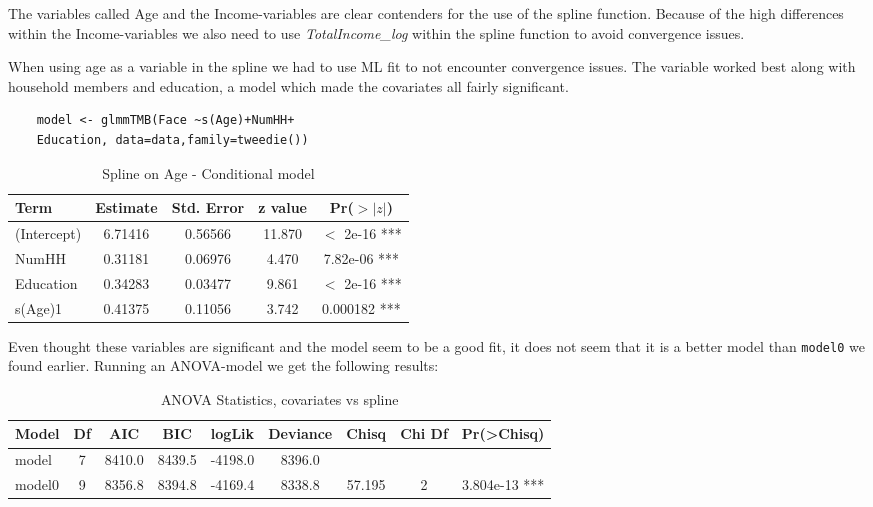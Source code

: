 \documentclass[12pt, twoside,hidelinks]{article}
\theoremstyle{definition}
\numberwithin{equation}{section}
\begin{document}
The variables called Age and the Income-variables are clear contenders for the use of the spline function. Because of the high differences within the Income-variables we also need to use \textit{TotalIncome\_log} within the spline function to avoid convergence issues.


\newline
When using age as a variable in the spline we had to use ML fit to not encounter convergence issues. The variable worked best along with household members and education, a model which made the covariates all fairly significant.


\begin{verbatim}
    model <- glmmTMB(Face ~s(Age)+NumHH+
    Education, data=data,family=tweedie())
\end{verbatim}

\begin{table}[h]
\centering
\begin{tabular}{lcccc}
\hline
Term        & Estimate & Std. Error & z value & Pr($>|z|$)      \\ 
\hline
(Intercept) & 6.71416  & 0.56566    & 11.870  & $<$ 2e-16 *** \\
NumHH       & 0.31181  & 0.06976    & 4.470   & 7.82e-06 *** \\
Education   & 0.34283  & 0.03477    & 9.861   & $<$ 2e-16 *** \\
s(Age)1     & 0.41375  & 0.11056    & 3.742   & 0.000182 *** \\
\hline
\end{tabular}
\caption{Spline on Age - Conditional model}
\label{table:conditional-model}
\end{table}

Even thought these variables are significant and the model seem to be a good fit, it does not seem that it is a better model than \texttt{model0} we found earlier. Running an ANOVA-model we get the following results:


\begin{table}[h]
\centering
\begin{tabular}{lcccccccr}
\hline
Model   & Df & AIC    & BIC    & logLik & Deviance & Chisq  & Chi Df & Pr(>Chisq)    \\ 
\hline
model   & 7  & 8410.0 & 8439.5 & -4198.0 & 8396.0   &        &        &               \\
model0  & 9  & 8356.8 & 8394.8 & -4169.4 & 8338.8   & 57.195 & 2      & 3.804e-13 *** \\
\hline
\end{tabular}
\caption{ANOVA Statistics, covariates vs spline}
\label{table:model-comparison}
\end{table}
\end{document}
